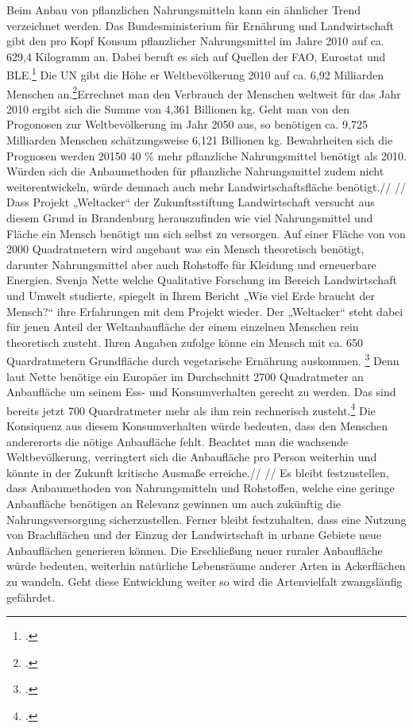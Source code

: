 \documentclass{scrartcl}
\begin{document}
Beim Anbau von pflanzlichen Nahrungsmitteln kann ein ähnlicher Trend verzeichnet werden. Das Bundesministerium für Ernährung und Landwirtschaft gibt den pro Kopf Konsum pflanzlicher Nahrungsmittel im Jahre 2010 auf ca. 629,4 Kilogramm an. Dabei beruft es sich auf Quellen der FAO, Eurostat und BLE.\footcite[Vgl.][S. 1]{bericht Bmel-statistik} Die UN gibt die Höhe er Weltbevölkerung 2010 auf ca. 6,92 Milliarden Menschen an.\footcite[Vgl.][S. 3]{World Population Prospects 2015}Errechnet man den Verbrauch der Menschen weltweit für das Jahr 2010 ergibt sich die Summe von 4,361 Billionen kg. Geht man von den Progonosen zur Weltbevölkerung im Jahr 2050 aus, so benötigen ca. 9,725 Milliarden Menschen schätzungsweise 6,121 Billionen kg. Bewahrheiten sich die Prognosen werden 20150 40 \% mehr pflanzliche Nahrungsmittel benötigt als 2010. Würden sich die Anbaumethoden für pflanzliche Nahrungsmittel zudem nicht weiterentwickeln, würde demnach auch mehr Landwirtschaftsfläche benötigt.//
//
Dass Projekt „Weltacker“ der Zukunftsstiftung Landwirtschaft versucht aus diesem Grund in Brandenburg herauszufinden wie viel Nahrungsmittel und Fläche ein Mensch benötigt um sich selbst zu versorgen. Auf einer Fläche von von 2000 Quadratmetern wird angebaut was ein Mensch theoretisch benötigt, darunter Nahrungsmittel aber auch Rohstoffe für Kleidung und erneuerbare Energien. Svenja Nette welche Qualitative Forschung im Bereich Landwirtschaft und Umwelt studierte, spiegelt in Ihrem Bericht „Wie viel Erde braucht der Mensch?“ ihre Erfahrungen mit dem Projekt wieder. Der „Weltacker“ steht dabei für jenen Anteil der Weltanbaufläche der einem einzelnen Menschen rein theoretisch zusteht. Ihren Angaben zufolge könne ein Mensch mit ca. 650 Quardratmetern Grundfläche durch vegetarische Ernährung auskommen. \footcite[Vgl.]{Wieviel Erde braucht der Mensch?}
Denn laut Nette benötige ein Europäer im Durchschnitt 2700 Quadratmeter an Anbaufläche um seinem Ess- und Konsumverhalten gerecht zu werden. Das sind bereits jetzt 700 Quardratmeter mehr als ihm rein rechnerisch zusteht.\footcite[Vgl.]{Wieviel Erde braucht der Mensch?} Die Konsiquenz aus diesem Konsumverhalten würde bedeuten, dass den Menschen andererorts die nötige Anbaufläche fehlt. Beachtet man die wachsende Weltbevölkerung, verringtert sich die Anbaufläche pro Person weiterhin und könnte in der Zukunft kritische Ausmaße erreiche.//
//
Es bleibt festzustellen, dass Anbaumethoden von Nahrungsmitteln und Rohstoffen, welche eine geringe Anbaufläche benötigen an Relevanz gewinnen um auch zukünftig die Nahrungsversorgung sicherzustellen. Ferner bleibt festzuhalten, dass eine Nutzung von Brachflächen und der Einzug der Landwirtschaft in urbane Gebiete neue Anbauflächen generieren können. Die Erschließung neuer ruraler Anbaufläche würde bedeuten, weiterhin natürliche Lebensräume anderer Arten in Ackerflächen zu wandeln. Geht diese Entwicklung weiter so wird die Artenvielfalt zwangsläufig gefährdet.
\end{document}
